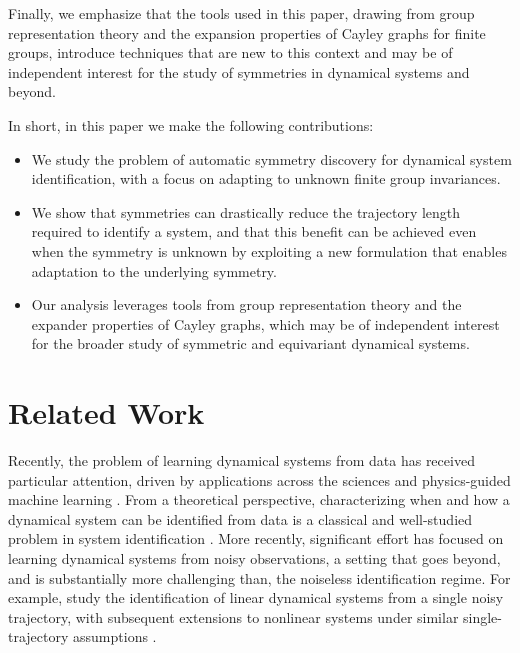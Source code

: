 \documentclass[11pt]{article}
\theoremstyle{plain}
\theoremstyle{definition}
\theoremstyle{remark}
\begin{document}
Finally, we emphasize that the tools used in this paper, drawing from group representation theory and the expansion properties of Cayley graphs for finite groups, introduce techniques that are new to this context and may be of independent interest for the study of symmetries in dynamical systems and beyond.



 
In short, in this paper we make the following contributions:
\begin{itemize}
    \item We study the problem of automatic symmetry discovery for dynamical system identification, with a focus on adapting to unknown finite group invariances.
    \item We show that symmetries can drastically reduce the trajectory length required to identify a system, and that this benefit can be achieved even when the symmetry is unknown by exploiting a new formulation that enables adaptation to the underlying symmetry.
    \item Our analysis leverages tools from group representation theory and the expander properties of Cayley graphs, which may be of independent interest for the broader study of symmetric and equivariant dynamical systems.
\end{itemize}




 
\section{Related Work}

Recently, the problem of learning dynamical systems from data has received particular attention, driven by applications across the sciences and physics-guided machine learning \citep{brunton2016discovering, yu2024learning, wang2025physics, sivaranjani2025control}. From a theoretical perspective, characterizing when and how a dynamical system can be identified from data is a classical and well-studied problem in system identification \citep{van2012subspace, isermann2011identification}. More recently, significant effort has focused on learning dynamical systems from noisy observations, a setting that goes beyond, and is substantially more challenging than, the noiseless identification regime. For example, \citet{simchowitz2018learning} study the identification of linear dynamical systems from a single noisy trajectory, with subsequent extensions to nonlinear systems under similar single-trajectory assumptions \citep{foster2020learning, ziemann2022single}.
\end{document}
